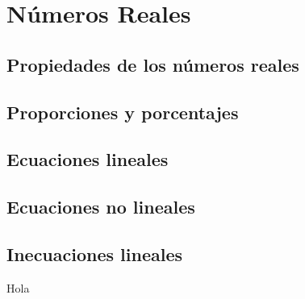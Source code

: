 \chapter{Números Reales}    

\section{Propiedades de los números reales}

\section{Proporciones y porcentajes}

\section{Ecuaciones lineales}

\section{Ecuaciones no lineales}

\section{Inecuaciones lineales}

Hola